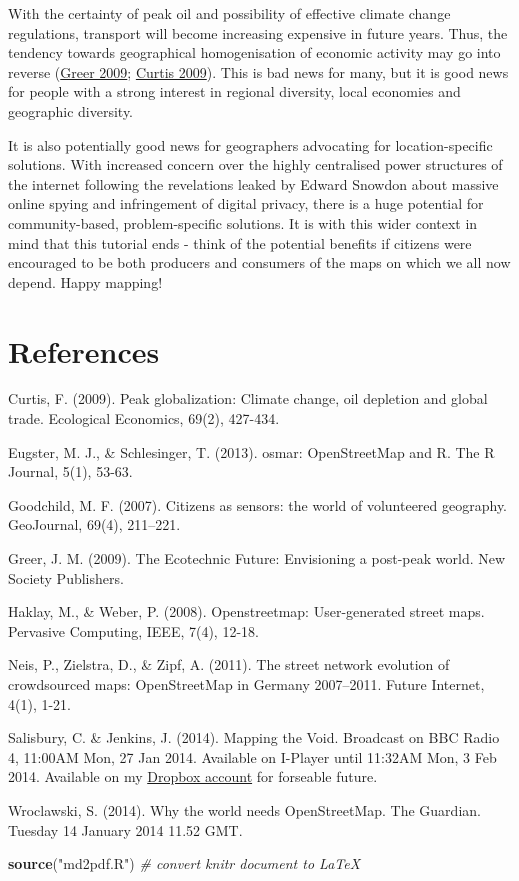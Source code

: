 \documentclass[]{article}
\newenvironment{Shaded}{}{}
\newcommand{\KeywordTok}[1]{\textcolor[rgb]{0.00,0.44,0.13}{\textbf{{#1}}}}
\newcommand{\StringTok}[1]{\textcolor[rgb]{0.25,0.44,0.63}{{#1}}}
\newcommand{\CommentTok}[1]{\textcolor[rgb]{0.38,0.63,0.69}{\textit{{#1}}}}
\newcommand{\NormalTok}[1]{{#1}}
\begin{document}
With the certainty of peak oil and possibility of effective climate
change regulations, transport will become increasing expensive in future
years. Thus, the tendency towards geographical homogenisation of
economic activity may go into reverse
(\href{http://books.google.co.uk/books?hl=en\&lr=\&id=mkV\_knlze0QC\&oi=fnd\&pg=PP2\&dq=ecotechnic+future\&ots=nATRuCVL31\&sig=bwafIZ7kfmZMK1EscQcKyIGeYsU\&redir\_esc=y\#v=onepage\&q=ecotechnic\%20future\&f=false}{Greer
2009};
\href{http://www.sciencedirect.com/science/article/pii/S0921800909003334}{Curtis
2009}). This is bad news for many, but it is good news for people with a
strong interest in regional diversity, local economies and geographic
diversity.

It is also potentially good news for geographers advocating for
location-specific solutions. With increased concern over the highly
centralised power structures of the internet following the revelations
leaked by Edward Snowdon about massive online spying and infringement of
digital privacy, there is a huge potential for community-based,
problem-specific solutions. It is with this wider context in mind that
this tutorial ends - think of the potential benefits if citizens were
encouraged to be both producers and consumers of the maps on which we
all now depend. Happy mapping!

\section{References}

Curtis, F. (2009). Peak globalization: Climate change, oil depletion and
global trade. Ecological Economics, 69(2), 427-434.

Eugster, M. J., \& Schlesinger, T. (2013). osmar: OpenStreetMap and R.
The R Journal, 5(1), 53-63.

Goodchild, M. F. (2007). Citizens as sensors: the world of volunteered
geography. GeoJournal, 69(4), 211--221.

Greer, J. M. (2009). The Ecotechnic Future: Envisioning a post-peak
world. New Society Publishers.

Haklay, M., \& Weber, P. (2008). Openstreetmap: User-generated street
maps. Pervasive Computing, IEEE, 7(4), 12-18.

Neis, P., Zielstra, D., \& Zipf, A. (2011). The street network evolution
of crowdsourced maps: OpenStreetMap in Germany 2007--2011. Future
Internet, 4(1), 1-21.

Salisbury, C. \& Jenkins, J. (2014). Mapping the Void. Broadcast on BBC
Radio 4, 11:00AM Mon, 27 Jan 2014. Available on I-Player until 11:32AM
Mon, 3 Feb 2014. Available on my
\href{https://dl.dropboxusercontent.com/u/15008199/egs2stay/Mapping\_the\_Void\_-\_Mapping\_the\_Void\_b03s6mf0\_default.m4a}{Dropbox
account} for forseable future.

Wroclawski, S. (2014). Why the world needs OpenStreetMap. The Guardian.
Tuesday 14 January 2014 11.52 GMT.

\begin{Shaded}
\begin{Highlighting}[]
\KeywordTok{source}\NormalTok{(}\StringTok{"md2pdf.R"}\NormalTok{)  }\CommentTok{# convert knitr document to LaTeX}
\end{Highlighting}
\end{Shaded}
\end{document}
